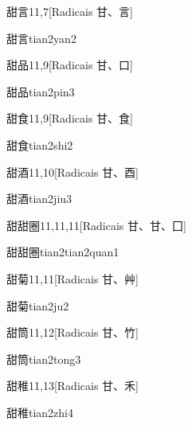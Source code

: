 \begin{entry}{甜言}{11,7}[Radicais ⽢、⾔]
  \begin{phonetics}{甜言}{tian2yan2}
  \end{phonetics}
\end{entry}

\begin{entry}{甜品}{11,9}[Radicais ⽢、⼝]
  \begin{phonetics}{甜品}{tian2pin3}
  \end{phonetics}
\end{entry}

\begin{entry}{甜食}{11,9}[Radicais ⽢、⾷]
  \begin{phonetics}{甜食}{tian2shi2}
  \end{phonetics}
\end{entry}

\begin{entry}{甜酒}{11,10}[Radicais ⽢、⾣]
  \begin{phonetics}{甜酒}{tian2jiu3}
  \end{phonetics}
\end{entry}

\begin{entry}{甜甜圈}{11,11,11}[Radicais ⽢、⽢、⼞]
  \begin{phonetics}{甜甜圈}{tian2tian2quan1}
  \end{phonetics}
\end{entry}

\begin{entry}{甜菊}{11,11}[Radicais ⽢、⾋]
  \begin{phonetics}{甜菊}{tian2ju2}
  \end{phonetics}
\end{entry}

\begin{entry}{甜筒}{11,12}[Radicais ⽢、⽵]
  \begin{phonetics}{甜筒}{tian2tong3}
  \end{phonetics}
\end{entry}

\begin{entry}{甜稚}{11,13}[Radicais ⽢、⽲]
  \begin{phonetics}{甜稚}{tian2zhi4}
  \end{phonetics}
\end{entry}

